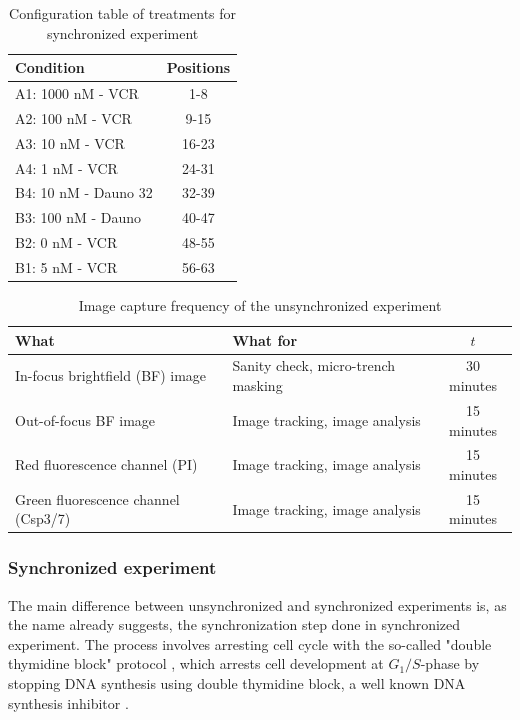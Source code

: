 \documentclass[pdftex,12pt,a4paper]{report}
\begin{document}
\begin{table}[H]
\centering
\begin{tabular}{| l | c |}
\hline
Condition & Positions \\
\hline
A1: 1000 nM - VCR & 1-8 \\
A2: 100 nM - VCR & 9-15 \\
A3: 10 nM - VCR & 16-23 \\
A4: 1 nM - VCR & 24-31 \\
B4: 10 nM - Dauno 32 & 32-39 \\
B3: 100 nM - Dauno & 40-47 \\
B2: 0 nM - VCR & 48-55 \\
B1: 5 nM - VCR & 56-63 \\
\hline
\end{tabular}
\caption{Configuration table of treatments for synchronized experiment}
\label{table:unsyn_treatments}
\end{table}

\begin{table}[H]
\centering
\begin{tabular}{| l | l | c |}
\hline
What & What for & $t$ \\
\hline
In-focus brightfield (BF) image & Sanity check, micro-trench masking & 30 minutes \\
Out-of-focus BF image & Image tracking, image analysis & 15 minutes \\
Red fluorescence channel (PI)& Image tracking, image analysis & 15 minutes \\
Green fluorescence channel (Csp3/7) & Image tracking, image analysis & 15 minutes \\
\hline
\end{tabular}
\caption{Image capture frequency of the unsynchronized experiment}
\label{table:image_capture_frequency}
\end{table}


\subsubsection*{Synchronized experiment}

The main difference between unsynchronized and synchronized experiments is, as the name already suggests, the synchronization step done in synchronized experiment. The process involves arresting cell cycle with the so-called "double thymidine block" protocol \cite{harper2005synchronization}, which arrests cell development at $G_1/S$-phase by stopping DNA synthesis using double thymidine block, a well known DNA synthesis inhibitor \cite{bostock1971evaluation}.
\end{document}
